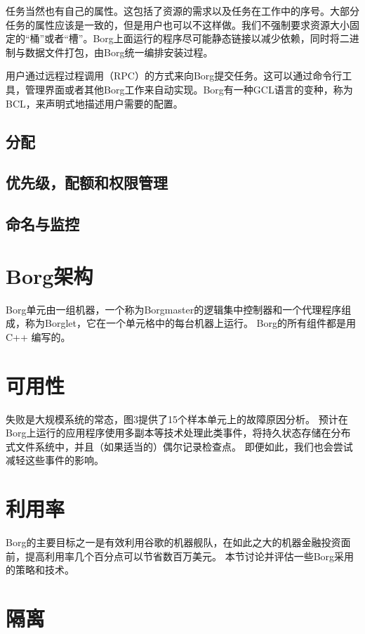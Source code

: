 任务当然也有自己的属性。这包括了资源的需求以及任务在工作中的序号。大部分任务的属性应该是一致的，但是用户也可以不这样做。我们不强制要求资源大小固定的“桶”或者“槽”。Borg上面运行的程序尽可能静态链接以减少依赖，同时将二进制与数据文件打包，由Borg统一编排安装过程。

用户通过远程过程调用（RPC）的方式来向Borg提交任务。这可以通过命令行工具，管理界面或者其他Borg工作来自动实现。Borg有一种GCL语言的变种，称为BCL，来声明式地描述用户需要的配置。

\subsection{分配}

\subsection{优先级，配额和权限管理}

\subsection{命名与监控}

\section{Borg架构}

Borg单元由一组机器，一个称为Borgmaster的逻辑集中控制器和一个代理程序组成，称为Borglet，它在一个单元格中的每台机器上运行。 Borg的所有组件都是用 C++ 编写的。

\section{可用性}

失败是大规模系统的常态，图3提供了15个样本单元上的故障原因分析。 预计在Borg上运行的应用程序使用多副本等技术处理此类事件，将持久状态存储在分布式文件系统中，并且（如果适当的）偶尔记录检查点。 即便如此，我们也会尝试减轻这些事件的影响。

\section{利用率}

Borg的主要目标之一是有效利用谷歌的机器舰队，在如此之大的机器金融投资面前，提高利用率几个百分点可以节省数百万美元。 本节讨论并评估一些Borg采用的策略和技术。

\section{隔离}

